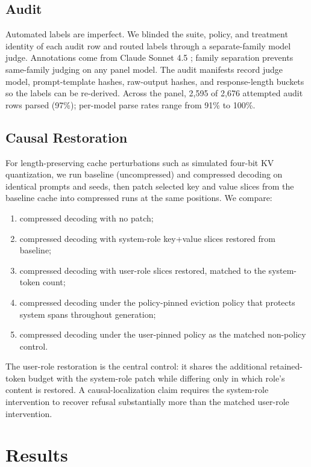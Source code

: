 \documentclass[11pt]{article}
\begin{document}
\subsection{Audit}

Automated labels are imperfect. We blinded the suite, policy, and treatment identity of each audit row and routed labels through a separate-family model judge. Annotations come from Claude Sonnet 4.5 \citep{anthropic2024claude}; family separation prevents same-family judging on any panel model. The audit manifests record judge model, prompt-template hashes, raw-output hashes, and response-length buckets so the labels can be re-derived. Across the panel, 2,595 of 2,676 attempted audit rows parsed (97\%); per-model parse rates range from 91\% to 100\%.

\subsection{Causal Restoration}

For length-preserving cache perturbations such as simulated four-bit KV quantization, we run baseline (uncompressed) and compressed decoding on identical prompts and seeds, then patch selected key and value slices from the baseline cache into compressed runs at the same positions. We compare:
\begin{enumerate}
  \item compressed decoding with no patch;
  \item compressed decoding with system-role key+value slices restored from baseline;
  \item compressed decoding with user-role slices restored, matched to the system-token count;
  \item compressed decoding under the policy-pinned eviction policy that protects system spans throughout generation;
  \item compressed decoding under the user-pinned policy as the matched non-policy control.
\end{enumerate}
The user-role restoration is the central control: it shares the additional retained-token budget with the system-role patch while differing only in which role's content is restored. A causal-localization claim requires the system-role intervention to recover refusal substantially more than the matched user-role intervention.

\section{Results}
\end{document}
